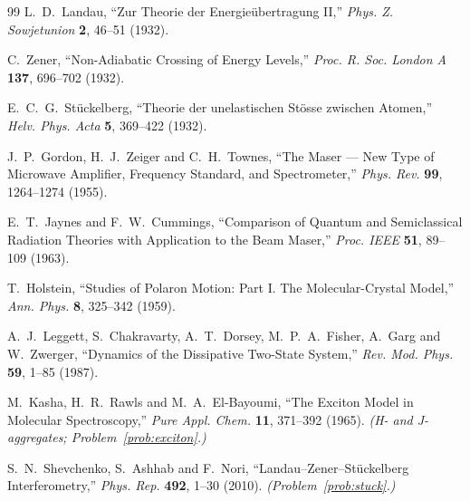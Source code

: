 \begin{thebibliography}{99}
L.~D.~Landau, ``Zur Theorie der Energie\"ubertragung II,''
\emph{Phys. Z. Sowjetunion} \textbf{2}, 46--51 (1932).

C.~Zener, ``Non-Adiabatic Crossing of Energy Levels,''
\emph{Proc. R. Soc. London A} \textbf{137}, 696--702 (1932).

E.~C.~G.~St\"uckelberg, ``Theorie der unelastischen St\"osse zwischen Atomen,''
\emph{Helv. Phys. Acta} \textbf{5}, 369--422 (1932).

J.~P.~Gordon, H.~J.~Zeiger and C.~H.~Townes, ``The Maser --- New Type of Microwave
Amplifier, Frequency Standard, and Spectrometer,''
\emph{Phys. Rev.} \textbf{99}, 1264--1274 (1955).

E.~T.~Jaynes and F.~W.~Cummings, ``Comparison of Quantum and Semiclassical Radiation
Theories with Application to the Beam Maser,''
\emph{Proc. IEEE} \textbf{51}, 89--109 (1963).

T.~Holstein, ``Studies of Polaron Motion: Part I. The Molecular-Crystal Model,''
\emph{Ann. Phys.} \textbf{8}, 325--342 (1959).

A.~J.~Leggett, S.~Chakravarty, A.~T.~Dorsey, M.~P.~A.~Fisher, A.~Garg and W.~Zwerger,
``Dynamics of the Dissipative Two-State System,''
\emph{Rev. Mod. Phys.} \textbf{59}, 1--85 (1987).

M.~Kasha, H.~R.~Rawls and M.~A.~El-Bayoumi, ``The Exciton Model in Molecular
Spectroscopy,'' \emph{Pure Appl. Chem.} \textbf{11}, 371--392 (1965).
\emph{(H- and J-aggregates; Problem~\ref{prob:exciton}.)}

S.~N.~Shevchenko, S.~Ashhab and F.~Nori, ``Landau--Zener--St\"uckelberg
Interferometry,'' \emph{Phys. Rep.} \textbf{492}, 1--30 (2010).
\emph{(Problem~\ref{prob:stuck}.)}

\end{thebibliography}
